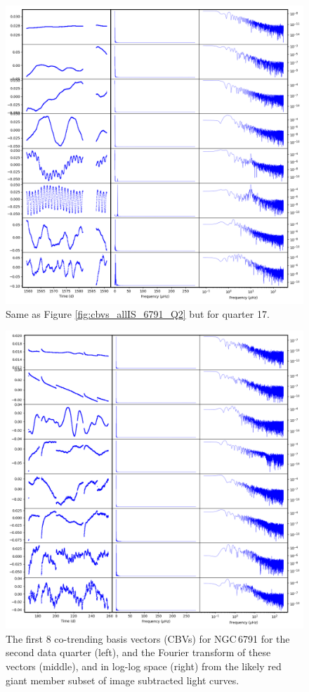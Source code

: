 \begin{figure}
    \centering
    \includegraphics[width=\linewidth]{Chapter_Appended/AppB/cbv_6791_q17.png}
    \caption{Same as Figure \ref{fig:cbvs_allIS_6791_Q2} but for quarter 17.}
    \label{fig:cbvs_allIS_6791_Q17}
\end{figure}


\begin{figure}
    \centering
    \includegraphics[width=\linewidth]{Chapter_Appended/AppB/cbv_6791_rgs_q02.png}
    \caption{The first 8 co-trending basis vectors (CBVs) for NGC\,6791 for the second data quarter (left), and the Fourier transform of these vectors (middle), and in log-log space (right) from the likely red giant member subset of image subtracted light curves.}
    \label{fig:cbvs_rgsIS_6791_Q2}
\end{figure}


